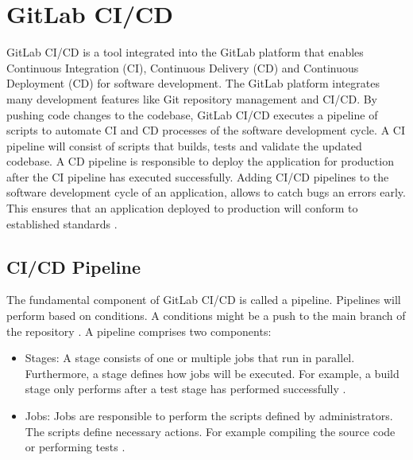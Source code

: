 \section{GitLab CI/CD}
\label{sec:04_background_gitlab}
GitLab CI/CD is a tool integrated into the GitLab platform that enables Continuous Integration (CI), Continuous Delivery (CD) and Continuous Deployment (CD) for software development.
The GitLab platform integrates many development features like Git repository management and CI/CD.
By pushing code changes to the codebase, GitLab CI/CD executes a pipeline of scripts to automate CI and CD processes of the software development cycle.
A CI pipeline will consist of scripts that builds, tests and validate the updated codebase.
A CD pipeline is responsible to deploy the application for production after the CI pipeline has executed successfully.
Adding CI/CD pipelines to the software development cycle of an application, allows to catch bugs an errors early. This ensures that an application deployed to production will conform to established standards \cite{Gitlab2020Docs}.

\subsection{CI/CD Pipeline}

The fundamental component of GitLab CI/CD is called a pipeline. Pipelines will perform based on conditions. A conditions might be a push to the main branch of the repository \cite{Gitlab2020Docs}. A pipeline comprises two components:

\begin{itemize}
\item Stages: A stage consists of one or multiple jobs that run in parallel. Furthermore, a stage defines how jobs will be executed. For example, a build stage only performs after a test stage has performed successfully \cite{Gitlab2020Docs}.

\item Jobs: Jobs are responsible to perform the scripts defined by administrators. The scripts define necessary actions. For example compiling the source code or performing tests \cite{Gitlab2020Docs}.
\end{itemize}


